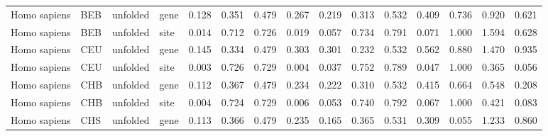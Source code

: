 \begin{longtable}{llllrrrrrrrrrrr}
        Homo sapiens &                       BEB &  unfolded &  gene &                              0.128 &                               0.351 &                 0.479 &                 0.267 &                              0.219 &                               0.313 &                 0.532 &                 0.409 &        0.736 &  0.920 &  0.621 \\
        Homo sapiens &                       BEB &  unfolded &  site &                              0.014 &                               0.712 &                 0.726 &                 0.019 &                              0.057 &                               0.734 &                 0.791 &                 0.071 &        1.000 &  1.594 &  0.628 \\
        Homo sapiens &                       CEU &  unfolded &  gene &                              0.145 &                               0.334 &                 0.479 &                 0.303 &                              0.301 &                               0.232 &                 0.532 &                 0.562 &        0.880 &  1.470 &  0.935 \\
        Homo sapiens &                       CEU &  unfolded &  site &                              0.003 &                               0.726 &                 0.729 &                 0.004 &                              0.037 &                               0.752 &                 0.789 &                 0.047 &        1.000 &  0.365 &  0.056 \\
        Homo sapiens &                       CHB &  unfolded &  gene &                              0.112 &                               0.367 &                 0.479 &                 0.234 &                              0.222 &                               0.310 &                 0.532 &                 0.415 &        0.664 &  0.548 &  0.208 \\
        Homo sapiens &                       CHB &  unfolded &  site &                              0.004 &                               0.724 &                 0.729 &                 0.006 &                              0.053 &                               0.740 &                 0.792 &                 0.067 &        1.000 &  0.421 &  0.083 \\
        Homo sapiens &                       CHS &  unfolded &  gene &                              0.113 &                               0.366 &                 0.479 &                 0.235 &                              0.165 &                               0.365 &                 0.531 &                 0.309 &        0.055 &  1.233 &  0.860 \\

\end{longtable}
